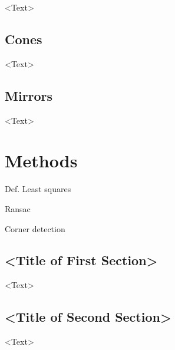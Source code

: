 \documentclass[11pt, oneside, reqno]{book}
\begin{document}
<Text>

\section{Cones}
\label{sec:con}

<Text>

\section{Mirrors}
\label{sec:mir}

<Text>





\chapter{Methods}
\label{chap:met}


Def. Least squares

Ransac

Corner detection


\section{<Title of First Section>}
\label{sec:A1}

<Text>

\section{<Title of Second Section>}
\label{sec:AB}

<Text>








\listoffigures



\singlespace
\end{document}

